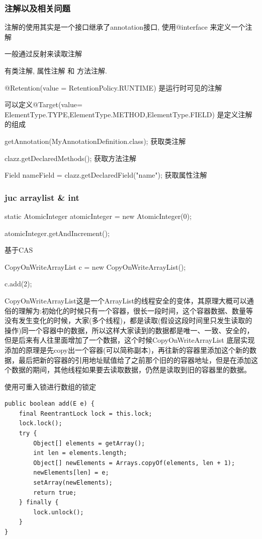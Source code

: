 \documentclass[UTF8]{ctexart}
\begin{document}
\subsubsection{注解以及相关问题}
注解的使用其实是一个接口继承了annotation接口, 使用@interface 来定义一个注解

一般通过反射来读取注解

有类注解, 属性注解 和 方法注解.

@Retention(value = RetentionPolicy.RUNTIME) 是运行时可见的注解

可以定义@Target(value= {ElementType.TYPE,ElementType.METHOD,ElementType.FIELD})  是定义注解的组成

getAnnotation(MyAnnotationDefinition.class); 获取类注解

clazz.getDeclaredMethods(); 获取方法注解

Field nameField =  clazz.getDeclaredField("name"); 获取属性注解


\subsubsection{juc arraylist \& int}
static AtomicInteger atomicInteger = new AtomicInteger(0);

atomicInteger.getAndIncrement();

基于CAS

CopyOnWriteArrayList c = new CopyOnWriteArrayList();

c.add(2);

CopyOnWriteArrayList这是一个ArrayList的线程安全的变体，其原理大概可以通俗的理解为:初始化的时候只有一个容器，很长一段时间，这个容器数据、数量等没有发生变化的时候，大家(多个线程)，都是读取(假设这段时间里只发生读取的操作)同一个容器中的数据，所以这样大家读到的数据都是唯一、一致、安全的，但是后来有人往里面增加了一个数据，这个时候CopyOnWriteArrayList 底层实现添加的原理是先copy出一个容器(可以简称副本)，再往新的容器里添加这个新的数据，最后把新的容器的引用地址赋值给了之前那个旧的的容器地址，但是在添加这个数据的期间，其他线程如果要去读取数据，仍然是读取到旧的容器里的数据。

使用可重入锁进行数组的锁定

\begin{lstlisting}
public boolean add(E e) {
	final ReentrantLock lock = this.lock;
	lock.lock();
	try {
		Object[] elements = getArray();
		int len = elements.length;
		Object[] newElements = Arrays.copyOf(elements, len + 1);
		newElements[len] = e;
		setArray(newElements);
		return true;
	} finally {
		lock.unlock();
	}
}
\end{lstlisting}
\end{document}
